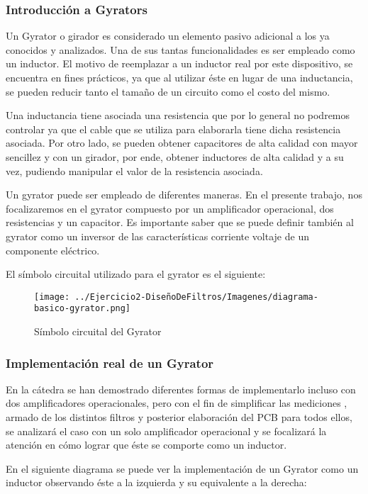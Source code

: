\subsubsection{Introducción a Gyrators}


Un Gyrator o girador es considerado un elemento pasivo adicional a los ya conocidos y analizados. Una de sus tantas funcionalidades es ser empleado como un inductor. 
El motivo de reemplazar a un inductor real por este dispositivo, se encuentra en fines prácticos, ya que al utilizar éste en lugar de una inductancia, se pueden reducir 
tanto el tamaño de un circuito como el costo del mismo. 

Una inductancia tiene asociada una resistencia que por lo general no podremos controlar ya que el cable que se utiliza para elaborarla tiene dicha resistencia asociada. 
Por otro lado, se pueden obtener capacitores de alta calidad con mayor sencillez y con un girador, por ende, obtener inductores de alta calidad y a su vez, pudiendo manipular el valor de la resistencia asociada.

Un gyrator puede ser empleado de diferentes maneras. En el presente trabajo, nos focalizaremos en el gyrator compuesto por un amplificador operacional, dos resistencias y un capacitor.
Es importante saber que se puede definir también al gyrator como un inversor de las características corriente voltaje de un componente eléctrico.

El símbolo circuital utilizado para el gyrator es el siguiente:

\begin{figure}[H]
    \centering
    \texttt{[image: ../Ejercicio2-DiseñoDeFiltros/Imagenes/diagrama-basico-gyrator.png]}
    \caption{Símbolo circuital del Gyrator}
\end{figure}

\subsubsection{Implementación real de un Gyrator}

En la cátedra se han demostrado diferentes formas de implementarlo incluso con dos amplificadores operacionales, pero con el fin de simplificar las mediciones
, armado de los distintos filtros y posterior elaboración del PCB para todos ellos, se analizará el caso con un solo amplificador operacional y se focalizará la atención en cómo lograr que éste se comporte como un 
inductor.

En el siguiente diagrama se puede ver la implementación de un Gyrator como un inductor observando éste a la izquierda y su equivalente a la derecha:

